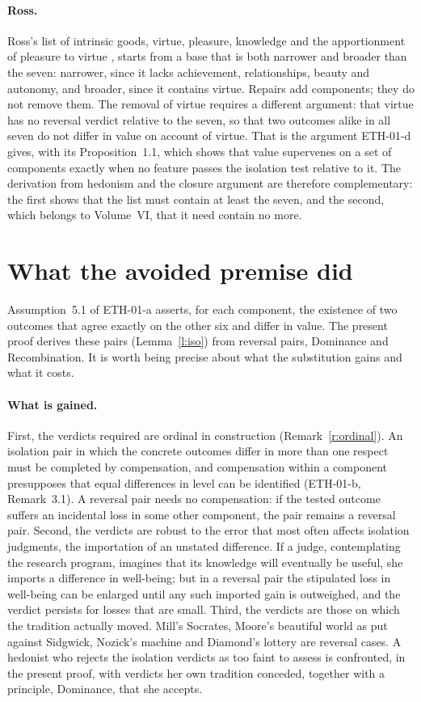 \documentclass{situationist-preprint}
\begin{document}
\paragraph{Ross.} Ross's list of intrinsic goods, virtue, pleasure, knowledge and the apportionment of pleasure to virtue \citep{Ross1930}, starts from a base that is both narrower and broader than the seven: narrower, since it lacks achievement, relationships, beauty and autonomy, and broader, since it contains virtue. Repairs add components; they do not remove them. The removal of virtue requires a different argument: that virtue has no reversal verdict relative to the seven, so that two outcomes alike in all seven do not differ in value on account of virtue. That is the argument ETH-01-d gives, with its Proposition~1.1, which shows that value supervenes on a set of components exactly when no feature passes the isolation test relative to it. The derivation from hedonism and the closure argument are therefore complementary: the first shows that the list must contain at least the seven, and the second, which belongs to Volume~VI, that it need contain no more.

\section{What the avoided premise did}\label{s:premise}

Assumption~5.1 of ETH-01-a asserts, for each component, the existence of two outcomes that agree exactly on the other six and differ in value. The present proof derives these pairs (Lemma~\ref{l:iso}) from reversal pairs, Dominance and Recombination. It is worth being precise about what the substitution gains and what it costs.

\paragraph{What is gained.} First, the verdicts required are ordinal in construction (Remark~\ref{r:ordinal}). An isolation pair in which the concrete outcomes differ in more than one respect must be completed by compensation, and compensation within a component presupposes that equal differences in level can be identified (ETH-01-b, Remark~3.1). A reversal pair needs no compensation: if the tested outcome suffers an incidental loss in some other component, the pair remains a reversal pair. Second, the verdicts are robust to the error that most often affects isolation judgments, the importation of an unstated difference. If a judge, contemplating the research program, imagines that its knowledge will eventually be useful, she imports a difference in well-being; but in a reversal pair the stipulated loss in well-being can be enlarged until any such imported gain is outweighed, and the verdict persists for losses that are small. Third, the verdicts are those on which the tradition actually moved. Mill's Socrates, Moore's beautiful world as put against Sidgwick, Nozick's machine and Diamond's lottery are reversal cases. A hedonist who rejects the isolation verdicts as too faint to assess is confronted, in the present proof, with verdicts her own tradition conceded, together with a principle, Dominance, that she accepts.
\end{document}
